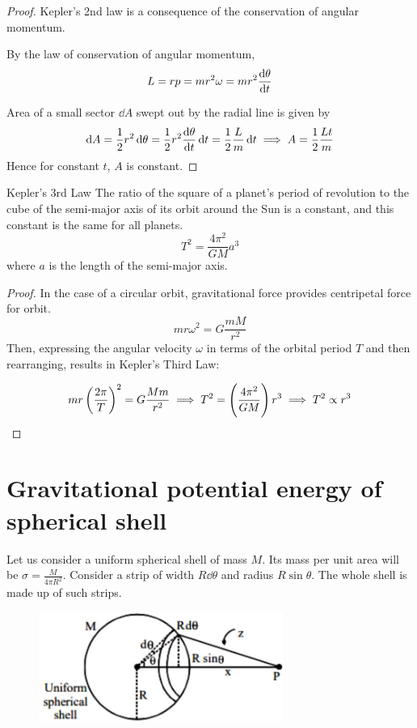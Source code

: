 \begin{proof}
Kepler's 2nd law is a consequence of the conservation of angular momentum.

By the law of conservation of angular momentum, 
\[ L = rp = mr^2\omega = mr^2\odv{\theta}{t} \]

Area of a small sector $\dd{A}$ swept out by the radial line is given by 
\[ \dd{A} = \frac{1}{2}r^2\dd{\theta} = \frac{1}{2}r^2\odv{\theta}{t}\dd{t} = \frac{1}{2}\frac{L}{m}\dd{t} \implies A=\frac{1}{2}\frac{Lt}{m} \]
Hence for constant $t$, $A$ is constant.
\end{proof}
\pagebreak

\begin{thrm}{Kepler's 3rd Law}{}
The ratio of the square of a planet's period of revolution to the cube of the semi-major axis of its orbit around the Sun is a constant, and this constant is the same for all planets.
\begin{equation}
T^2 = \frac{4\pi^2}{GM}a^3
\end{equation}
where $a$ is the length of the semi-major axis.
\end{thrm}

\begin{proof}
In the case of a circular orbit, gravitational force provides centripetal force for orbit.
\[ mr\omega^2 = G \frac{mM}{r^2} \]
Then, expressing the angular velocity $\omega$ in terms of the orbital period $T$ and then rearranging, results in Kepler's Third Law:

\[ mr\left(\frac{2\pi}{T}\right)^2 = G\frac{Mm}{r^2} \implies T^2 = \left(\frac {4\pi^2}{GM}\right)r^3 \implies T^2\propto r^3 \]
\end{proof}
\pagebreak

\section{Gravitational potential energy of spherical shell}
Let us consider a uniform spherical shell of mass $M$. Its mass per unit area will be $\sigma = \frac{M}{4\pi R^2}$. Consider a strip of width $R\dd{\theta}$ and radius $R\sin\theta$. The whole shell is made up of such strips.

\begin{figure}[H]
    \centering
    \includegraphics[width=8cm]{images/spherical_shell_gpe.jpg}
\end{figure}

